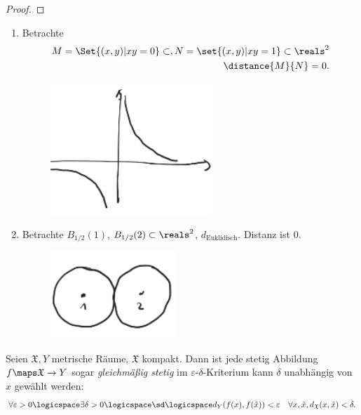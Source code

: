 \begin{beispiel*}
\begin{proof}
    \end{proof}
    \begin{achtung*}
        \begin{enumerate}
            \item Betrachte
            \begin{align*}
                M=\Set{(x,y)|xy=0}\subset , N=\set{(x,y)|xy=1}\subset \reals^2\\
                \distance{M}{N}=0.
            \end{align*}
            \begin{figure}[H]
                \centering
                \includegraphics[width=0.3\linewidth]{figures/achsen_und_eins_durch_x}
                \caption*{}
                \label{fig:achsen_und_eins_durch_x}
            \end{figure}
            
            \item Betrachte \( B_{1/2}(1) \), \( B_{1/2}(2)\subset \reals^2 \), \( d_{\text{Euklidisch}} \). Distanz ist \( 0 \).
            \begin{figure}[H]
                \centering
                \includegraphics[width=0.3\linewidth]{figures/beruehrende_kreise}
                \label{fig:beruehrende_kreise}
            \end{figure}
            
        \end{enumerate}
    \end{achtung*}    
\end{beispiel*}
\begin{satzdef}
    Seien \( \mathfrak{X},Y \) metrische Räume, \( \mathfrak{X} \) kompakt. Dann ist jede stetig Abbildung \( f\maps \mathfrak{X}\to Y \) sogar \emph{gleichmäßig stetig} \dh im \( \varepsilon \)-\( \delta \)-Kriterium kann \( \delta \) unabhängig von \( x \) gewählt werden:
    \begin{align*}
        \forall \varepsilon>0\logicspace \exists \delta>0\logicspace\text{\sd}\logicspace d_Y(f(x),f(\tilde{x}))<\varepsilon\quad \forall x,\tilde{x},d_{\mathfrak{X}}(x,\tilde{x})<\delta.
    \end{align*}
\end{satzdef}
